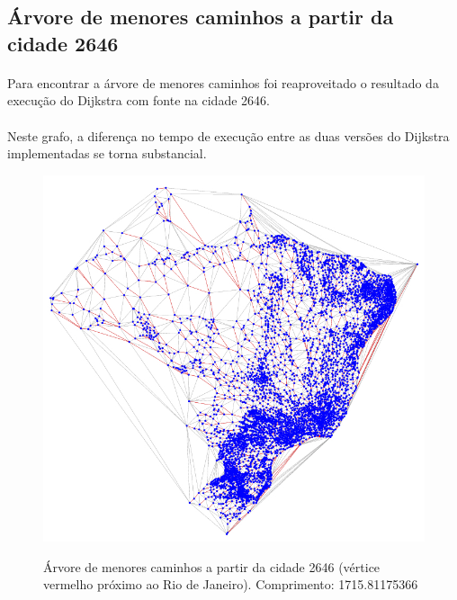 \documentclass[11pt,a4paper]{article}
\begin{document}
        \subsection{Árvore de menores caminhos a partir da cidade 2646}
        \paragraph{}
        Para encontrar a árvore de menores caminhos foi reaproveitado o resultado da execução do Dijkstra com fonte na cidade 2646.

        \paragraph{}
        Neste grafo, a diferença no tempo de execução entre as duas versões do Dijkstra implementadas se torna substancial.

        \begin{figure}[htb!]
          \centering
              \captionsetup{justification=centering}  
              \includegraphics[scale=0.45]{BR2646}
              \label{fig:BR2646}
              \caption{Árvore de menores caminhos a partir da cidade 2646 (vértice vermelho próximo ao Rio de Janeiro). Comprimento: 1715.81175366}
        \end{figure}
\end{document}
